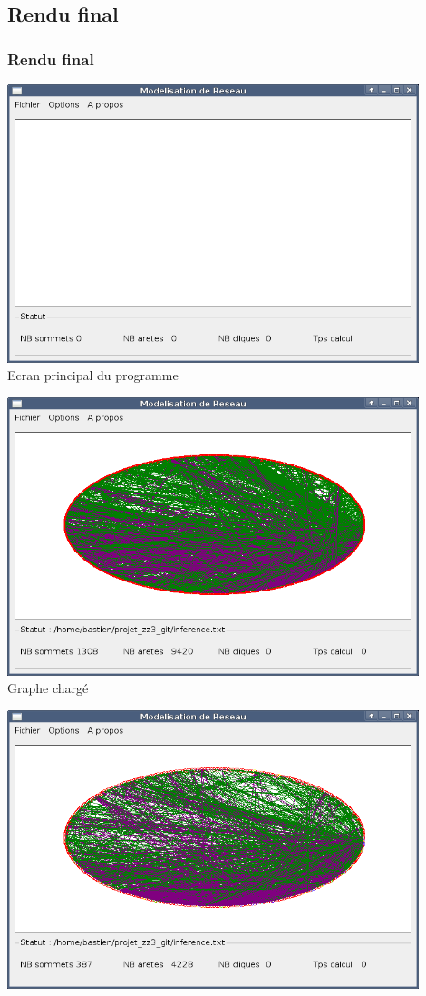 \subsection{Rendu final}
\frame
{
\frametitle{Rendu final}
{
   \begin{center}
   \includegraphics[width=0.9\textwidth]{ecran_programme.png}\\
   Ecran principal du programme
   \end{center}
}
{
   \begin{center}
   \includegraphics[width=0.9\textwidth]{ecran_graphe.png}\\
   Graphe charg\'e
   \end{center}
}
{
   \begin{center}
   \includegraphics[width=0.9\textwidth]{ecran_graphe_nostubs.png}\\

\end{center}}}
